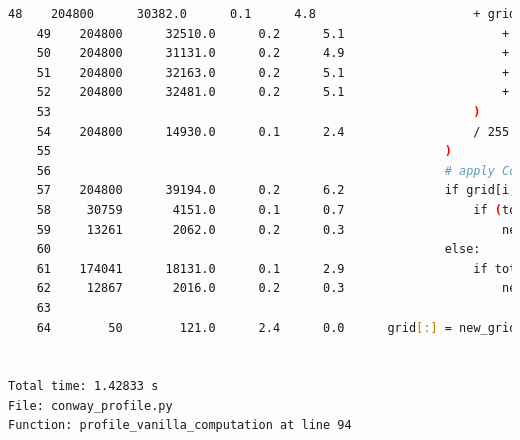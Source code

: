 \documentclass[a4paper,12pt]{article}
\begin{document}
\begin{lstlisting}[language=bash,basicstyle=\tiny\ttfamily]
    48    204800      30382.0      0.1      4.8                      + grid[(i + 1) % n, j]                                                 
    49    204800      32510.0      0.2      5.1                      + grid[(i - 1) % n, (j - 1) % n]                                       
    50    204800      31131.0      0.2      4.9                      + grid[(i - 1) % n, (j + 1) % n]                                       
    51    204800      32163.0      0.2      5.1                      + grid[(i + 1) % n, (j - 1) % n]                                       
    52    204800      32481.0      0.2      5.1                      + grid[(i + 1) % n, (j + 1) % n]                                       
    53                                                           )                                                                          
    54    204800      14930.0      0.1      2.4                  / 255                                                                      
    55                                                       )                                                                              
    56                                                       # apply Conway's rules                                                         
    57    204800      39194.0      0.2      6.2              if grid[i, j] == ON:                                                           
    58     30759       4151.0      0.1      0.7                  if (total < 2) or (total > 3):                                             
    59     13261       2062.0      0.2      0.3                      new_grid[i, j] = OFF                                                   
    60                                                       else:                                                                          
    61    174041      18131.0      0.1      2.9                  if total == 3:                                                             
    62     12867       2016.0      0.2      0.3                      new_grid[i, j] = ON                                                    
    63                                                                                                                                      
    64        50        121.0      2.4      0.0      grid[:] = new_grid[:]                                                                  


Total time: 1.42833 s
File: conway_profile.py
Function: profile_vanilla_computation at line 94


\end{lstlisting}
\end{document}
